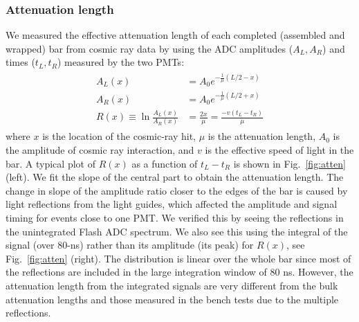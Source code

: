 \documentclass[3p,final,twocolumn]{elsarticle}
\begin{document}
\subsubsection{Attenuation length \label{attenlen}}
We measured the effective attenuation length of each completed
(assembled and wrapped) bar from cosmic ray data by using the ADC
amplitudes ($A_L,A_R$) and times ($t_L,t_R$) measured by the two PMTs:
\begin{eqnarray}
	\begin{split}
		A_L(x) &= A_0 e^{-\frac{1}{\mu}\left(L/2-x\right) }				\\
		A_R(x) &= A_0 e^{-\frac{1}{\mu}\left(L/2+x\right) }				\\
		R(x) \equiv \ln{\frac{A_L(x)}{A_R(x)}} &= \frac{2x}{\mu} = \frac{-v(t_{L}-t_{R})}{\mu}			
		 \label{eqn:atten}
	\end{split}
\end{eqnarray}
where $x$ is the location of the cosmic-ray hit, $\mu$ is the
attenuation length, $A_0$ is the amplitude of cosmic ray interaction,
and $v$ is the effective speed of light in the bar.  A typical plot of
$R(x)$ as a function of $t_{L}-t_{R}$ is shown in Fig.~\ref{fig:atten}
(left).  We fit the slope of the central part to obtain the
attenuation length.  The change in slope of the amplitude ratio closer
to the edges of the bar is caused by light reflections from the light
guides, which affected the amplitude and signal timing for events close to one
PMT. We verified this by seeing the reflections in the unintegrated
Flash ADC spectrum.  We also see this using the integral of the signal (over
80-ns) rather than
its amplitude (its peak) for $R(x)$, see Fig.~\ref{fig:atten} (right). The
distribution is linear over the whole bar since most of
the reflections are included in the large integration window of 80
\si{\nano\s}. However, the attenuation length from the integrated
signals are very different from the bulk attenuation lengths and those
measured in the bench tests due to the multiple reflections.
\end{document}
